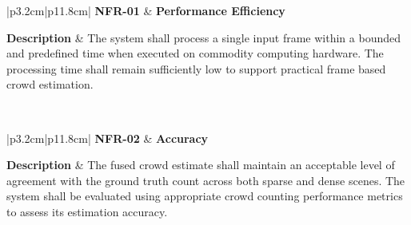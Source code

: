 
\begin{table}[H]
	\centering
	\renewcommand{\arraystretch}{1.25}
	\begin{tabular}{|p{3.2cm}|p{11.8cm}|}
		\hline
		\textbf{NFR-01} &
		\textbf{Performance Efficiency} \\ \hline
		
		\textbf{Description} &
		The system shall process a single input frame within a bounded and predefined time when executed on commodity computing hardware. The processing time shall remain sufficiently low to support practical frame based crowd estimation. \\ \hline
		
		 \\ \hline
	\end{tabular}
	\caption{Non-functional requirement for performance efficiency.}
	\label{tab:nfr01}
\end{table}


\begin{table}[H]
	\centering
	\renewcommand{\arraystretch}{1.25}
	\begin{tabular}{|p{3.2cm}|p{11.8cm}|}
		\hline
		\textbf{NFR-02} &
		\textbf{Accuracy} \\ \hline
		
		\textbf{Description} &
		The fused crowd estimate shall maintain an acceptable level of agreement with the ground truth count across both sparse and dense scenes. The system shall be evaluated using appropriate crowd counting performance metrics to assess its estimation accuracy. \\ \hline
		
		 \\ \hline
	\end{tabular}
	\caption{Non-functional requirement for crowd counting accuracy.}
	\label{tab:nfr02}
\end{table}

